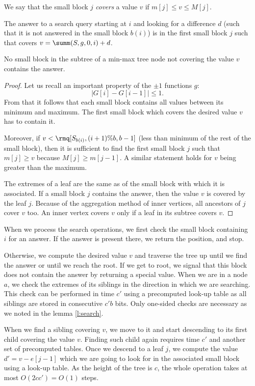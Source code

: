 We say that the small block $j$ \emph{covers} a value $v$ if $m[j] \le v \le M[j]$.

\begin{lemma}\label{l:search}
	The answer to a search query starting at $i$ and looking for a difference $d$ (such that it is not answered in the small block $b(i)$) is in the first small block $j$ such that covers $v = \summ(S, g, 0, i) + d$.
	
	No small block in the subtree of a min-max tree node not covering the value $v$ contains the answer.
\end{lemma}
\begin{proof}
	Let us recall an important property of the $\pm 1$ functions $g$: 
	$$| G[i] - G[i-1] | \le 1.$$
	From that it follows that each small block contains all values between its minimum and maximum.
	The first small block which covers the desired value $v$ has to contain it.
	
	Moreover, if $v < \rmq[S_{b(i)}, (i + 1) \% b, b - 1]$ (less than minimum of the rest of the small block), then it is sufficient to find the first small block $j$ such that $m[j] \ge v$ because $M[j] \ge m[j-1]$.
	A similar statement holds for $v$ being greater than the maximum.
	
	The extremes of a leaf are the same as of the small block with which it is associated.
	If a small block $j$ contains the answer, then the value $v$ is covered by the leaf $j$.
	Because of the aggregation method of inner vertices, all ancestors of $j$ cover $v$ too.
	An inner vertex covers $v$ only if a leaf in its subtree covers $v$.
\end{proof}

When we process the search operations, we first check the small block containing $i$ for an answer.
If the answer is present there, we return the position, and stop.

Otherwise, we compute the desired value $v$ and traverse the tree up until we find the answer or until we reach the root.
If we get to root, we signal that this block does not contain the answer by returning a special value.
When we are in a node $a$, we check the extremes of its siblings in the direction in which we are searching.
This check can be performed in time $c'$ using a precomputed look-up table as all siblings are stored in consecutive $c' b$ bits.
Only one-sided checks are necessary as we noted in the lemma \ref{l:search}.

When we find a sibling covering $v$, we move to it and start descending to its first child covering the value $v$.
Finding such child again requires time $c'$ and another set of precomputed tables.
Once we descend to a leaf $j$, we compute the value $d' = v - e[j - 1]$ which we are going to look for in the associated small block using a look-up table. 
As the height of the tree is $c$, the whole operation takes at most $O(2 c c') = O(1)$ steps.

